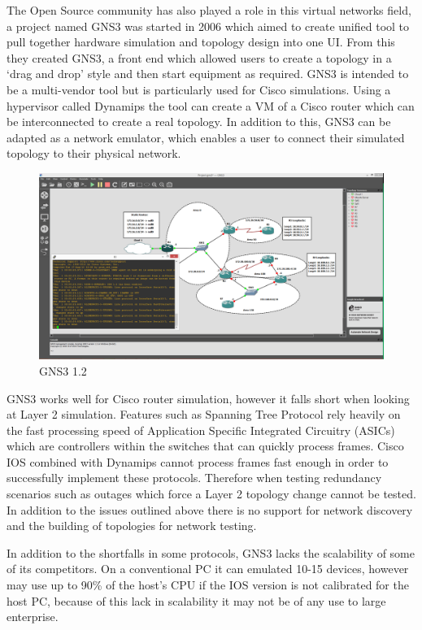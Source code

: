 \documentclass[11pt]{report}
\begin{document}
The Open Source community has also played a role in this virtual networks field, a project named GNS3 \citep{GNS31.2} was started in 2006 which aimed to create  unified tool to pull together hardware simulation and topology design into one UI. From this they created GNS3, a front end which allowed users to create a topology in a ‘drag and drop’ style and then start equipment as required. GNS3 is intended to be a multi-vendor tool but is particularly used for Cisco simulations. Using a hypervisor called Dynamips the tool can create a VM of a Cisco router which can be interconnected to create a real topology. In addition to this, GNS3 can be adapted as a network emulator, which enables a user to connect their simulated topology to their physical network.

\begin{figure}[h!]
	\caption{GNS3 1.2}
	\centering
	\includegraphics[width=1\textwidth]{GNS3.png}
\end{figure}

GNS3 works well for Cisco router simulation, however it falls short when looking at Layer 2 simulation. Features such as Spanning Tree Protocol rely heavily on the fast processing speed of Application Specific Integrated Circuitry (ASICs) which are controllers within the switches that can quickly process frames. Cisco IOS combined with Dynamips cannot process frames fast enough in order to successfully implement these protocols. Therefore when testing redundancy scenarios such as outages which force a Layer 2 topology change cannot be tested. In addition to the issues outlined above there is no support for network discovery and the building of topologies for network testing.

In addition to the shortfalls in some protocols, GNS3 lacks the scalability of some of its competitors. On a conventional PC it can emulated 10-15 devices, however may use up to 90\% of the host's CPU if the IOS version is not calibrated for the host PC, because of this lack in scalability it may not be of any use to large enterprise.
\end{document}
